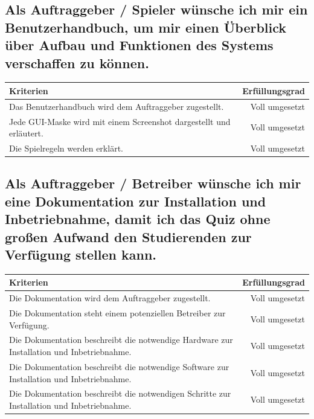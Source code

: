 \documentclass[a4paper,11pt,listof=numbered,glossary=totoc,parskip=half,toc=bib]{scrreprt}
\begin{document}
\begin{appendices}
\begin{tabularx}{\textwidth}{Xr}
			\bottomrule
		\end{tabularx}	
				
		\subsection{Als Auftraggeber / Spieler wünsche ich mir ein Benutzerhandbuch, um mir einen Überblick über
Aufbau und Funktionen des Systems verschaffen zu können.}
		\begin{tabularx}{\textwidth}{Xr}
			
			Kriterien & Erfüllungsgrad \\
			\midrule
		Das Benutzerhandbuch wird dem Auftraggeber zugestellt. & Voll umgesetzt\\
		Jede GUI-Maske wird mit einem Screenshot dargestellt und erläutert. & Voll umgesetzt\\
		Die Spielregeln werden erklärt. & Voll umgesetzt\\
			\bottomrule
		\end{tabularx}	
		
		\subsection{Als Auftraggeber / Betreiber wünsche ich mir eine Dokumentation zur Installation und
Inbetriebnahme, damit ich das Quiz ohne großen Aufwand den Studierenden zur Verfügung stellen
kann.}
		\begin{tabularx}{\textwidth}{Xr}
			
			Kriterien & Erfüllungsgrad \\
			\midrule
		Die Dokumentation wird dem Auftraggeber zugestellt. & Voll umgesetzt \\
		Die Dokumentation steht einem potenziellen Betreiber zur Verfügung. & Voll umgesetzt \\
		Die Dokumentation beschreibt die notwendige Hardware zur Installation und Inbetriebnahme. & Voll umgesetzt \\
		Die Dokumentation beschreibt die notwendige Software zur Installation und Inbetriebnahme. & Voll umgesetzt \\
		Die Dokumentation beschreibt die notwendigen Schritte zur Installation und Inbetriebnahme. & Voll umgesetzt \\
		
			\bottomrule
		\end{tabularx}	

		
			
		
		

\end{appendices}
\end{document}
